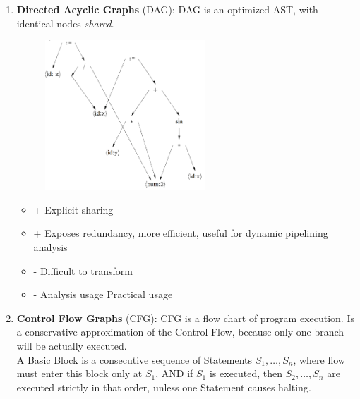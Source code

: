 \documentclass[a4paper]{exam}
\theoremstyle{definition}
\begin{document}
\begin{enumerate}
\begin{enumerate}
          \item \textbf{Directed Acyclic Graphs} (DAG): DAG is an optimized AST, with identical nodes \textit{shared}.\\
                \begin{figure}[htbp]
                  \centering
                  \includegraphics[width=6cm]{img/Snipaste_2021-04-19_07-11-03.png}
                \end{figure}
                \begin{itemize}
                  \item + Explicit sharing
                  \item + Exposes redundancy, more efficient, useful for dynamic pipelining analysis
                  \item - Difficult to transform
                  \item - Analysis usage Practical usage
                \end{itemize}
          \item \textbf{Control Flow Graphs} (CFG): CFG is a flow chart of program execution. Is a conservative approximation of the Control Flow, because only one branch will be actually executed.\\
                A Basic Block is a consecutive sequence of Statements $S_{1}, \ldots, S_{n}$, where flow must enter this block only at $S_{1}$, AND if $S_{1}$ is executed, then $S_{2}, \ldots, S_{n}$ are executed strictly in that order, unless one Statement causes halting.


\end{enumerate}
\end{enumerate}
\end{document}
